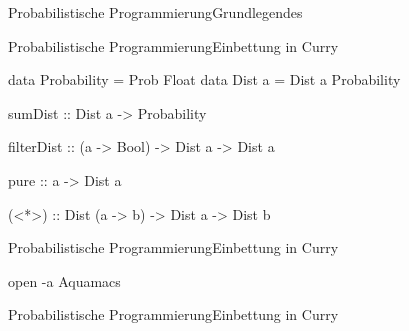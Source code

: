 \documentclass{beamer}
\begin{document}
\begin{frame}{Probabilistische Programmierung}{Grundlegendes}
\begin{minipage}{0.7\textwidth}
{}
\end{minipage}

\end{frame}


\begin{frame}[fragile]{Probabilistische Programmierung}{Einbettung in Curry}

\small
\begin{semiverbatim}
data Probability = Prob Float
data Dist a      = Dist a Probability

sumDist :: Dist a -> Probability

filterDist :: (a -> Bool) -> Dist a -> Dist a

pure :: a -> Dist a

(<*>) :: Dist (a -> b) -> Dist a -> Dist b
\end{semiverbatim}

\end{frame}

\begin{frame}[fragile]{Probabilistische Programmierung}{Einbettung in
    Curry}
\begin{semiverbatim}

open -a Aquamacs

\end{semiverbatim}

\end{frame}

\begin{frame}[fragile]{Probabilistische Programmierung}{Einbettung in
    Curry}
\small
{}
\end{frame}
\end{document}
